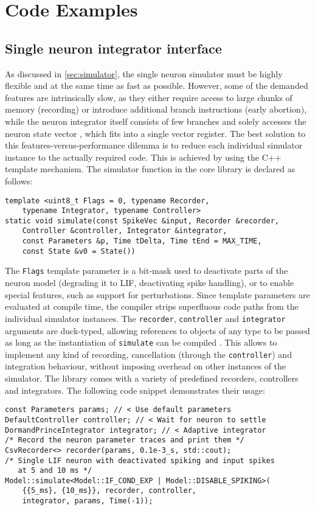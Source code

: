\chapter{Code Examples}

\section{Single neuron integrator interface}
\label{app:simulator_code}

As discussed in \cref{sec:simulator}, the single neuron simulator must be highly flexible and at the same time as fast as possible. However, some of the demanded features are intrinsically slow, as they either require access to large chunks of memory (recording) or introduce additional branch instructions (early abortion), while the neuron integrator itself consists of few branches and solely accesses the neuron state vector \nState, which fits into a single vector register. The best solution to this features-versus-performance dilemma is to reduce each individual simulator instance to the actually required code. This is achieved by using the C++ template mechanism. The simulator function in the core library is declared as follows:
\begin{verbatim}
template <uint8_t Flags = 0, typename Recorder,
    typename Integrator, typename Controller>
static void simulate(const SpikeVec &input, Recorder &recorder,
    Controller &controller, Integrator &integrator,
    const Parameters &p, Time tDelta, Time tEnd = MAX_TIME,
    const State &v0 = State())
\end{verbatim}
The \texttt{Flags} template parameter is a bit-mask used to deactivate parts of the neuron model (degrading it to \acrshort{LIF}, deactivating spike handling), or to enable special features, such as support for perturbations. Since template parameters are evaluated at compile time, the compiler strips superfluous code paths from the individual simulator instances. The \texttt{recorder}, \texttt{controller} and \texttt{integrator} arguments are duck-typed, allowing references to objects of any type to be passed as long as the instantiation of \texttt{simulate} can be compiled \cite{stroustrup2013duck}. This allows to implement any kind of recording, cancellation (through the \texttt{controller}) and integration behaviour, without imposing overhead on other instances of the simulator. The \AdExpSim library comes with a variety of predefined recorders, controllers and integrators. The following code snippet demonstrates their usage:
\begin{verbatim}
const Parameters params; // < Use default parameters
DefaultController controller; // < Wait for neuron to settle
DormandPrinceIntegrator integrator; // < Adaptive integrator
/* Record the neuron parameter traces and print them */
CsvRecorder<> recorder(params, 0.1e-3_s, std::cout);
/* Single LIF neuron with deactivated spiking and input spikes
   at 5 and 10 ms */
Model::simulate<Model::IF_COND_EXP | Model::DISABLE_SPIKING>(
	{{5_ms}, {10_ms}}, recorder, controller,
	integrator, params, Time(-1));
\end{verbatim}

